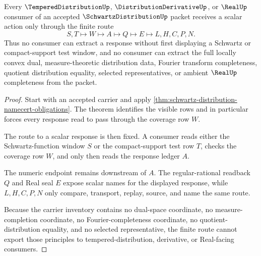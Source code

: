 \begin{theorem}\label{thm:schwartz-distribution-test-window-nonescape}
Every $\TemperedDistributionUp$, $\DistributionDerivativeUp$, or $\RealUp$ consumer of an accepted $\SchwartzDistributionUp$ packet receives a scalar action only through the finite route
$$
S,T\longmapsto W\longmapsto A\longmapsto Q\longmapsto E\longmapsto L,H,C,P,N .
$$
Thus no consumer can extract a response without first displaying a Schwartz or compact-support test window, and no consumer can extract the full locally convex dual, measure-theoretic distribution data, Fourier transform completeness, quotient distribution equality, selected representatives, or ambient $\RealUp$ completeness from the packet.
\end{theorem}
\begin{proof}
Start with an accepted carrier and apply \autoref{thm:schwartz-distribution-namecert-obligations}. The theorem identifies the visible rows and in particular forces every response read to pass through the coverage row $W$.

The route to a scalar response is then fixed. A consumer reads either the Schwartz-function window $S$ or the compact-support test row $T$, checks the coverage row $W$, and only then reads the response ledger $A$.

The numeric endpoint remains downstream of $A$. The regular-rational readback $Q$ and Real seal $E$ expose scalar names for the displayed response, while $L,H,C,P,N$ only compare, transport, replay, source, and name the same route.

Because the carrier inventory contains no dual-space coordinate, no measure-completion coordinate, no Fourier-completeness coordinate, no quotient-distribution equality, and no selected representative, the finite route cannot export those principles to tempered-distribution, derivative, or Real-facing consumers.
\end{proof}



